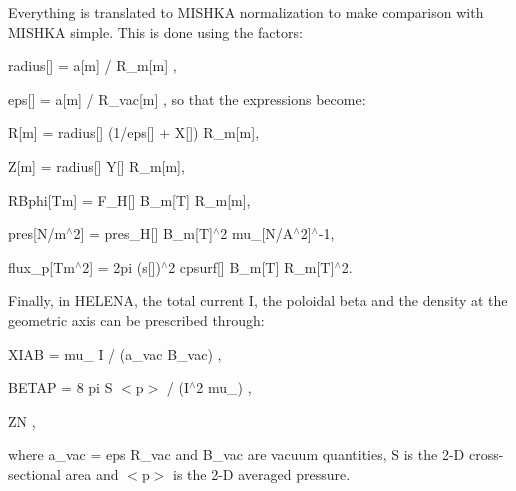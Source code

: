 Everything is translated to M\+I\+S\+H\+KA normalization to make comparison with M\+I\+S\+H\+KA simple. This is done using the factors\+:
\begin{DoxyItemize}
\item {\ttfamily  radius\mbox{[}\mbox{]} = a\mbox{[}m\mbox{]} / R\+\_\+m\mbox{[}m\mbox{]} },
\item {\ttfamily  eps\mbox{[}\mbox{]} = a\mbox{[}m\mbox{]} / R\+\_\+vac\mbox{[}m\mbox{]} }, so that the expressions become\+:
\item {\ttfamily  R\mbox{[}m\mbox{]} = radius\mbox{[}\mbox{]} (1/eps\mbox{[}\mbox{]} + X\mbox{[}\mbox{]}) R\+\_\+m\mbox{[}m\mbox{]}},
\item {\ttfamily  Z\mbox{[}m\mbox{]} = radius\mbox{[}\mbox{]} Y\mbox{[}\mbox{]} R\+\_\+m\mbox{[}m\mbox{]}},
\item {\ttfamily  R\+Bphi\mbox{[}Tm\mbox{]} = F\+\_\+H\mbox{[}\mbox{]} B\+\_\+m\mbox{[}T\mbox{]} R\+\_\+m\mbox{[}m\mbox{]}},
\item {\ttfamily  pres\mbox{[}N/m$^\wedge$2\mbox{]} = pres\+\_\+H\mbox{[}\mbox{]} B\+\_\+m\mbox{[}T\mbox{]}$^\wedge$2 mu\+\_\mbox{[}N/\+A$^\wedge$2\mbox{]}$^\wedge$-\/1},
\item {\ttfamily  flux\+\_\+p\mbox{[}Tm$^\wedge$2\mbox{]} = 2pi (s\mbox{[}\mbox{]})$^\wedge$2 cpsurf\mbox{[}\mbox{]} B\+\_\+m\mbox{[}T\mbox{]} R\+\_\+m\mbox{[}T\mbox{]}$^\wedge$2}.
\end{DoxyItemize}

Finally, in H\+E\+L\+E\+NA, the total current {\ttfamily I}, the poloidal beta and the density at the geometric axis can be prescribed through\+:
\begin{DoxyItemize}
\item {\ttfamily  X\+I\+AB = mu\+\_ I / (a\+\_\+vac B\+\_\+vac) },
\item {\ttfamily  B\+E\+T\+AP = 8 pi S $<$p$>$ / (I$^\wedge$2 mu\+\_) },
\item {\ttfamily  ZN },
\end{DoxyItemize}

where {\ttfamily  a\+\_\+vac = eps R\+\_\+vac } and {\ttfamily B\+\_\+vac} are vacuum quantities, {\ttfamily S} is the 2-\/D cross-\/sectional area and $<$p$>$ is the 2-\/D averaged pressure.

